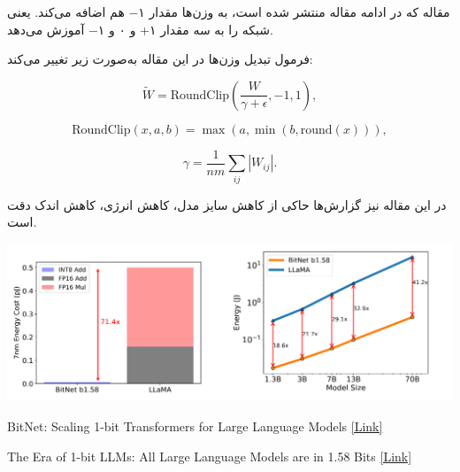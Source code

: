 \begin{qsolve}
	مقاله \cite{ref2} که در ادامه مقاله \cite{ref1} منتشر شده است، به وزن‌ها مقدار ۱− هم اضافه می‌کند. یعنی شبکه را به سه مقدار ۱+ و ۰ و ۱− آموزش می‌دهد.
	
	
	فرمول تبدیل وزن‌ها در این مقاله به‌صورت زیر تغییر می‌کند:
	
	\[
	\widetilde{W} = \text{RoundClip}\left(\frac{W}{\gamma + \epsilon}, -1, 1\right),
	\]
	
	\[
	\text{RoundClip}(x, a, b) = \max(a, \min(b, \text{round}(x))),
	\]
	
	\[
	\gamma = \frac{1}{nm} \sum_{ij} |W_{ij}|.
	\]
	
	در این مقاله نیز گزارش‌ها حاکی از کاهش سایز مدل، کاهش انرژی، کاهش اندک دقت است.
	
	\begin{center}
		\includegraphics*[width=1\linewidth]{pics/img16.png}
		\label{نتایج ارائه شده در ref2}
	\end{center}
	
	
\end{qsolve}






\begin{latin}
	\begin{thebibliography}{9}
		BitNet: Scaling 1-bit Transformers for Large Language Models
		\href{https://arxiv.org/abs/2310.11453}{[Link]}
		
		
		The Era of 1-bit LLMs: All Large Language Models are in 1.58 Bits
		\href{https://arxiv.org/abs/2402.17764}{[Link]}
	\end{thebibliography} 
\end{latin}